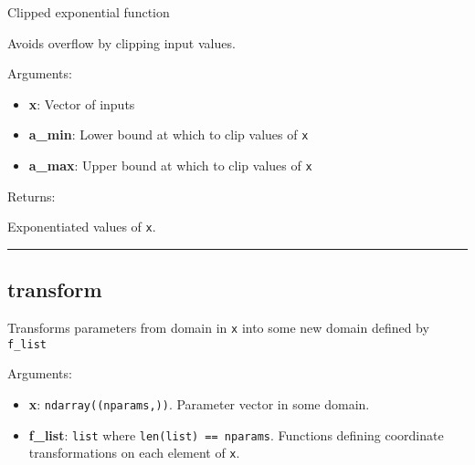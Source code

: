 \begin{Shaded}
\begin{Highlighting}[]
\OperatorTok{=-}\OperatorTok{=}\NormalTok{)}
\end{Highlighting}
\end{Shaded}

Clipped exponential function

Avoids overflow by clipping input values.

Arguments:

\begin{itemize}
\tightlist
\item
  \textbf{x}: Vector of inputs
\item
  \textbf{a\_min}: Lower bound at which to clip values of \texttt{x}
\item
  \textbf{a\_max}: Upper bound at which to clip values of \texttt{x}
\end{itemize}

Returns:

Exponentiated values of \texttt{x}.

\begin{center}\rule{0.5\linewidth}{\linethickness}\end{center}

\subsection{transform}\label{transform}

\begin{Shaded}
\begin{Highlighting}[]
\end{Highlighting}
\end{Shaded}

Transforms parameters from domain in \texttt{x} into some new domain
defined by \texttt{f\_list}

Arguments:

\begin{itemize}
\tightlist
\item
  \textbf{x}: \texttt{ndarray((nparams,))}. Parameter vector in some
  domain.
\item
  \textbf{f\_list}: \texttt{list} where \texttt{len(list)\ ==\ nparams}.
  Functions defining coordinate transformations on each element of
  \texttt{x}.
\end{itemize}

